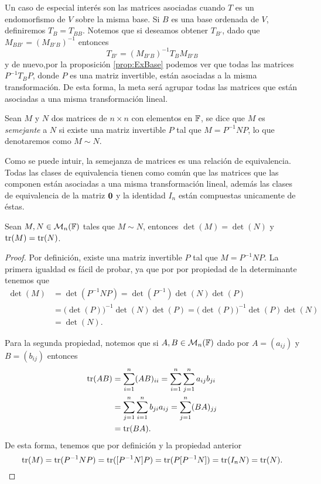 Un caso de especial interés son las matrices asociadas cuando $T$ es un endomorfismo de $V$ sobre la misma base. Si $B$ es una base ordenada de $V$, definiremos $T_B = T_{BB}$. Notemos que si deseamos obtener $T_{B'}$, dado que $M_{BB'} = (M_{B'B})^{-1}$ entonces 
  \[ T_{B'} = (M_{B'B})^{-1} T_B M_{B'B} \]
y de nuevo,por la proposición \ref{prop:ExBase} podemos ver que todas las matrices $P^{-1}T_{B}P$, donde $P$ es una matriz invertible, están asociadas a la misma transformación. De esta forma, la meta será agrupar todas las matrices que están asociadas a una misma transformación lineal.

\begin{defi}
  Sean $M$ y $N$ dos matrices de $n \times n$ con elementos en $\mathbb{F}$, se dice que $M$ es \emph{semejante} a $N$ si existe una matriz invertible $P$ tal que $M = P^{-1}NP$, lo que denotaremos como $M \sim N$.
\end{defi}

Como se puede intuir, la semejanza de matrices es una relación de equivalencia. Todas las clases de equivalencia tienen como común que las matrices que las componen están asociadas a una misma transformación lineal, además las clases de equivalencia de la matriz $\mathbf{0}$ y la identidad $I_n$ están compuestas unicamente de éstas. 

\begin{prop}
  Sean $M,N \in \mathcal{M}_n(\mathbb{F})$ tales que $M \sim N$, entonces $\det(M) = \det(N)$ y $\operatorname{tr}(M) = \operatorname{tr}(N)$.
\end{prop}
\begin{proof}
  Por definición, existe una matriz invertible $P$ tal que $M = P^{-1}NP$. La primera igualdad es fácil de probar, ya que por por propiedad de la determinante tenemos  que
  \begin{align*}
    \det(M) &= \det(P^{-1}NP) = \det(P^{-1})\det(N) \det(P)  \\
      &= \bigl(\det(P)\bigr)^{-1} \det(N) \det(P) = \bigl(\det(P)\bigr)^{-1}\det(P)\det(N)  \\
      &= \det(N).
  \end{align*}
  
  Para la segunda propiedad, notemos que si $A,B \in \mathcal{M}_n(\mathbb{F})$ dado por $A = (a_{ij})$ y $B = (b_{ij})$ entonces
  \begin{align*}
    \operatorname{tr}(AB) &= \sum_{i=1}^n (AB)_{ii} = \sum_{i=1}^n \sum_{j=1}^n a_{ij} b_{ji} \\
      &=  \sum_{j=1}^n \sum_{i=1}^n b_{ji} a_{ij} = \sum_{j=1}^n (BA)_{jj} \\
      &= \operatorname{tr}(BA).
  \end{align*}
  De esta forma, tenemos que por definición y la propiedad anterior
  \[ \operatorname{tr}(M) = \operatorname{tr}(P^{-1}NP) = \operatorname{tr}([P^{-1}N]P) = \operatorname{tr}(P[P^{-1}N]) = \operatorname{tr}(I_n N) = \operatorname{tr}(N). \]
\end{proof}

